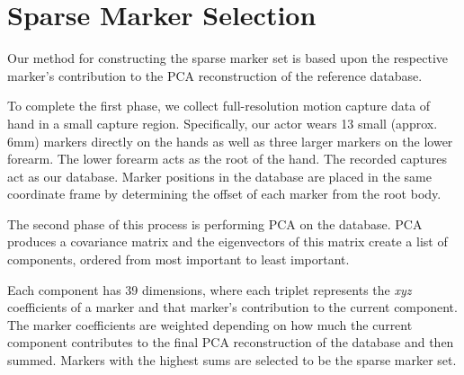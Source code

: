 
\section{Sparse Marker Selection}
Our method for constructing the sparse marker set is
based upon the respective marker's contribution to the PCA 
reconstruction of the reference database.

To complete the first phase, we collect full-resolution motion capture 
data of hand in a small capture region. 
Specifically, our actor wears 13 small
(approx. 6mm) markers directly on the hands as well as three larger 
markers on the lower forearm. 
The lower forearm acts as the root of the hand. The recorded 
captures act as our database. Marker positions in the database 
are placed in the same coordinate
frame by determining the offset of each marker from the root body.



The second phase of this process is performing PCA on the database.
PCA produces a covariance matrix and the eigenvectors
of this matrix create a list of components, ordered from most important
to least important.

Each component has 39 dimensions, where each triplet represents the 
\emph{xyz} coefficients of a marker and that marker's contribution
to the current component. The marker coefficients are weighted depending 
on how much the current component contributes to the final PCA reconstruction
of the database and then summed. Markers with the highest sums are selected to
be the sparse marker set.


